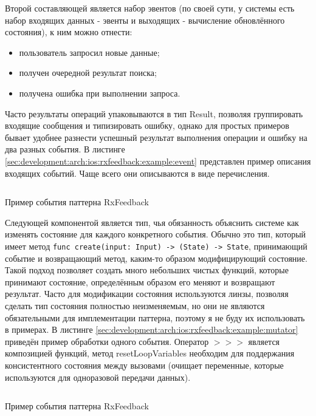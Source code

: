 Второй составляющей является набор эвентов (по своей сути, у системы есть набор входящих данных - эвенты и выходящих - вычисление обновлённого состояния), к ним можно отнести:

\begin{itemize}
  \item пользователь запросил новые данные;
  \item получен очередной результат поиска;
  \item получена ошибка при выполнении запроса.
\end{itemize}

Часто результаты операций упаковываются в тип Result, позволяя группировать входящие сообщения и типизировать ошибку, однако для простых примеров бывает удобнее разнести успешный результат выполнения операции и ошибку на два разных события. В листинге \ref{sec:development:arch:ios:rxfeedback:example:event} представлен пример описания входящих событий. Чаще всего они описываются в виде перечисления.

\begin{code}
  \inputminted{swift}{inc/src/rx-feedback-event.swift}
   \caption{Пример события паттерна RxFeedback}
   \label{sec:development:arch:ios:rxfeedback:example:event}
\end{code}

Следующей компонентой является тип, чья обязанность объяснить системе как изменять состояние для каждого конкретного события. Обычно это тип, который имеет метод \texttt{func create(input: Input) -> (State) -> State}, принимающий событие и возвращающий метод, каким-то образом модифицирующий состояние. Такой подход позволяет создать много небольших чистых функций, которые принимают состояние, определённым образом его меняют и возвращают результат. Часто для модификации состояния используются линзы, позволяя сделать тип состояния полностью неизменяемым, но они не являются обязательными для имплементации паттерна, поэтому я не буду их использовать в примерах. В листинге \ref{sec:development:arch:ios:rxfeedback:example:mutator} приведён пример обработки одного события. Оператор \(>>>\) является композицией функций, метод resetLoopVariables необходим для поддержания консистентного состояния между вызовами (очищает переменные, которые используются для одноразовой передачи данных).

\begin{code}
  \inputminted{swift}{inc/src/rx-feedback-state-mutator.swift}
   \caption{Пример события паттерна RxFeedback}
   \label{sec:development:arch:ios:rxfeedback:example:mutator}
\end{code}

